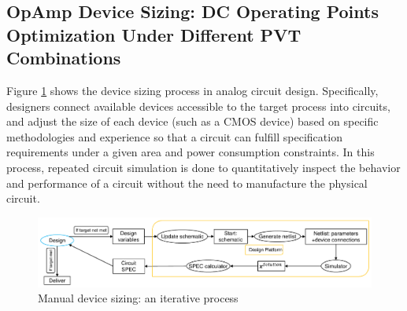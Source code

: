 \subsection{OpAmp Device Sizing: DC Operating Points Optimization Under Different PVT Combinations}
Figure \ref{fig:manually-design} shows the device sizing process in analog circuit design. Specifically, designers connect available devices accessible to the target process into circuits, and adjust the size of each device (such as a CMOS device) based on specific methodologies and experience so that a circuit can fulfill specification requirements under a given area and power consumption constraints. In this process, repeated circuit simulation is done to quantitatively inspect the behavior and performance of a circuit without the need to manufacture the physical circuit.
\begin{figure}[htpb]
  \centering
  \includegraphics[width=\textwidth]{fig/manually-design.pdf}
  \caption{Manual device sizing: an iterative process}
  \label{fig:manually-design}
\end{figure}

